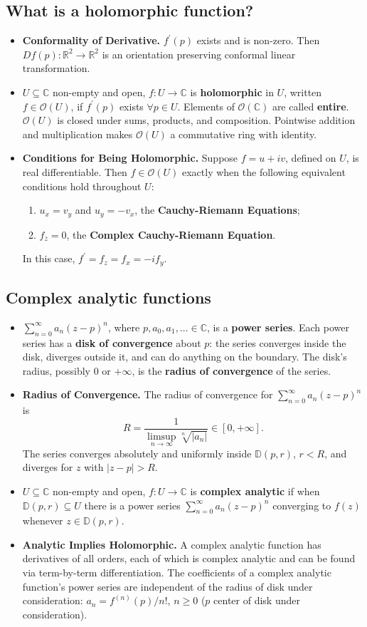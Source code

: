 \documentclass{article}
\newenvironment{topic}[1]{%
{\subsection{#1}}%
\begin{itemize}%
}{%
\end{itemize}%
}
\newcommand{\theorem}[1]{\item {\bf #1.}}
\newcommand{\corollary}[1]{\item {\bf #1.}}
\newcommand{\term}[1]{{\bf #1}}
\newcommand{\holo}[1]{\mathcal{O}(#1)}
\newcommand{\remark}{\item}
\newcommand{\entire}{\holo{\mathbb{C}}}
\newcommand{\disk}[2]{\mathbb{D}(#1, #2)}
\begin{document}
\begin{topic}{What is a holomorphic function?}
\corollary{Conformality of Derivative} $f^\prime(p)$ exists and is non-zero. Then $Df(p) : \mathbb{R}^2 \to \mathbb{R}^2$ is an orientation preserving conformal linear transformation.

\remark $U \subseteq \mathbb{C}$ non-empty and open, $f : U \to \mathbb{C}$ is \term{holomorphic} in $U$, written $f \in \holo{U}$, if $f^\prime(p)$ exists $\forall p \in U$. Elements of $\entire{}$ are called \term{entire}. $\holo{U}$ is closed under sums, products, and composition. Pointwise addition and multiplication makes $\holo{U}$ a commutative ring with identity.

\theorem{Conditions for Being Holomorphic} Suppose $f = u + iv$, defined on $U$, is real differentiable. Then $f \in \holo{U}$ exactly when the following equivalent conditions hold throughout $U$:
\begin{enumerate}
\item $u_x = v_y$ and $u_y = -v_x$, the \term{Cauchy-Riemann Equations};
\item $f_{\overline{z}} = 0$, the \term{Complex Cauchy-Riemann Equation}.
\end{enumerate}
In this case, $f^\prime = f_z = f_x = -if_y$.

\end{topic}


\begin{topic}{Complex analytic functions}

\remark $\sum_{n=0}^\infty a_n (z - p)^n$, where $p, a_0, a_1, \ldots \in \mathbb{C}$, is a \term{power series}. Each power series has a \term{disk of convergence} about $p$: the series converges inside the disk, diverges outside it, and can do anything on the boundary. The disk's radius, possibly $0$ or $+\infty$, is the \term{radius of convergence} of the series.

\theorem{Radius of Convergence} The radius of convergence for $\sum_{n=0}^\infty a_n (z - p)^n$ is $$R = \dfrac{1}{\limsup_{n \to \infty} \sqrt[n]{|a_n|}} \in [0, +\infty].$$ The series converges absolutely and uniformly inside $\disk{p}{r}$, $r < R$, and diverges for $z$ with $|z - p| > R$.

\remark $U \subseteq \mathbb{C}$ non-empty and open, $f : U \to \mathbb{C}$ is \term{complex analytic} if when $\disk{p}{r} \subseteq U$ there is a power series $\sum_{n=0}^\infty a_n (z - p)^n$ converging to $f(z)$ whenever $z \in \disk{p}{r}$.

\theorem{Analytic Implies Holomorphic} A complex analytic function has derivatives of all orders, each of which is complex analytic and can be found via term-by-term differentiation. The coefficients of a complex analytic function's power series are independent of the radius of disk under consideration: $a_n = f^{(n)}(p) / n!$, $n \geq 0$ ($p$ center of disk under consideration).

\end{topic}
\end{document}
